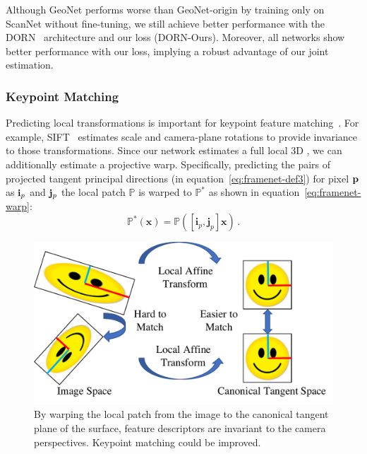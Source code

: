 Although GeoNet performs worse than GeoNet-origin by training only on ScanNet without fine-tuning, we still achieve better performance with the DORN~\cite{fu2018deep} architecture and our loss (DORN-Ours). Moreover, all networks show better performance with our loss, implying a robust advantage of our joint estimation. 

\subsubsection{Keypoint Matching}

Predicting local transformations is important for 
keypoint feature matching~\cite{lowe2004distinctive,bay2006surf,tola2010daisy,han2015matchnet,zagoruyko2015learning,simo2015discriminative,yi2016lift}. 
For example, SIFT~\cite{lowe2004distinctive} estimates scale and camera-plane rotations to provide invariance to those transformations.  Since
our network estimates a full local 3D \cframe{}, we can additionally estimate a projective warp.  
Specifically, predicting the pairs of projected tangent principal directions (in equation~\ref{eq:framenet-def3}) for pixel $\mathbf{p}$ as $\mathbf{i}_p$ and $\mathbf{j}_p$ the local patch $\mathbb{P}$ is warped to $\mathbb{P}^*$ as shown in equation~\ref{eq:framenet-warp}:
\begin{equation}
    \mathbb{P}^*(\textbf{x}) = \mathbb{P}([\textbf{i}_p, \textbf{j}_p]\textbf{x})\,.
    \label{eq:framenet-warp}
\end{equation}

\begin{figure}[t]
\centering
    \includegraphics[width=0.7\linewidth]{FrameNet/graph/match.pdf}
    \caption{By warping the local patch from the image to the canonical tangent plane of the surface, feature descriptors are invariant to the camera perspectives. Keypoint matching could be improved.}
    \label{fig:framenet-warp}
\end{figure}

